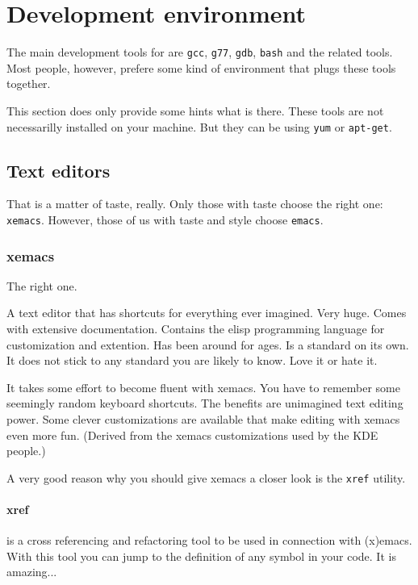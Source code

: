 \section{Development environment}

The main development tools for \ccarat{} are \texttt{gcc}, \texttt{g77},
\texttt{gdb}, \texttt{bash} and the related tools. Most people, however,
prefere some kind of environment that plugs these tools together.

This section does only provide some hints what is there. These tools
are not necessarilly installed on your machine. But they can be using
\texttt{yum} or \texttt{apt-get}.


\subsection{Text editors \label{sec:Text-editors}}

That is a matter of taste, really. Only those with taste choose the
right one: \texttt{xemacs}. However, those of us with taste and style
choose \texttt{emacs}.


\subsubsection{xemacs}

The right one.

A text editor that has shortcuts for everything ever imagined. Very
huge. Comes with extensive documentation. Contains the elisp programming
language for customization and extention. Has been around for ages.
Is a standard on its own. It does not stick to any standard you are
likely to know. Love it or hate it.

It takes some effort to become fluent with xemacs. You have to remember
some seemingly random keyboard shortcuts. The benefits are unimagined
text editing power. Some clever customizations are available that
make editing with xemacs even more fun. (Derived from the xemacs customizations
used by the KDE people.)

A very good reason why you should give xemacs a closer look is the
\texttt{xref} utility.


\paragraph{xref}

is a cross referencing and refactoring tool to be used in connection
with (x)emacs. With this tool you can jump to the definition of any
symbol in your code. It is amazing...

